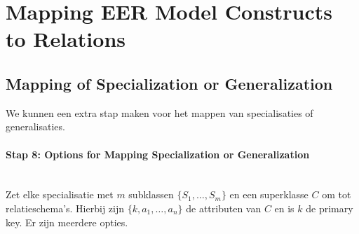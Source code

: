 \section{Mapping EER Model Constructs to Relations}
\subsection{Mapping of Specialization or Generalization}
We kunnen een extra stap maken voor het mappen van specialisaties of generalisaties.

\paragraph{Stap 8: Options for Mapping Specialization or Generalization}~\vspace{2mm}\\ 
Zet elke specialisatie met $m$ subklassen $\{S_1, \dots, S_m\}$ en een superklasse $C$ om tot relatieschema's. Hierbij zijn $\{k, a_1, \dots, a_n\} $ de attributen van $C$ en is $k$ de primary key. Er zijn meerdere opties.

